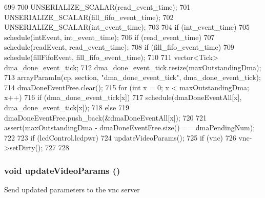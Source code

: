 \begin{DoxyCode}
{699 
700     UNSERIALIZE_SCALAR(read_event_time);
701     UNSERIALIZE_SCALAR(fill_fifo_event_time);
702     UNSERIALIZE_SCALAR(int_event_time);
703 
704     if (int_event_time)
705         schedule(intEvent, int_event_time);
706     if (read_event_time)
707         schedule(readEvent, read_event_time);
708     if (fill_fifo_event_time)
709         schedule(fillFifoEvent, fill_fifo_event_time);
710 
711     vector<Tick> dma_done_event_tick;
712     dma_done_event_tick.resize(maxOutstandingDma);
713     arrayParamIn(cp, section, "dma_done_event_tick", dma_done_event_tick);
714     dmaDoneEventFree.clear();
715     for (int x = 0; x < maxOutstandingDma; x++) {
716         if (dma_done_event_tick[x])
717             schedule(dmaDoneEventAll[x], dma_done_event_tick[x]);
718         else
719             dmaDoneEventFree.push_back(&dmaDoneEventAll[x]);
720     }
721     assert(maxOutstandingDma - dmaDoneEventFree.size() == dmaPendingNum);
722 
723     if (lcdControl.lcdpwr) {
724         updateVideoParams();
725         if (vnc)
726             vnc->setDirty();
727     }
728 }
\end{DoxyCode}
\hypertarget{classPl111_a13d435a77cf1f2fa37400a9c98a3764a}{
\subsubsection[{updateVideoParams}]{\setlength{\rightskip}{0pt plus 5cm}void updateVideoParams ()}}
\label{classPl111_a13d435a77cf1f2fa37400a9c98a3764a}
Send updated parameters to the vnc server 


